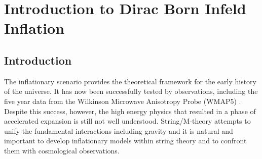 \renewcommand{\CVSrevision}{\version$Id: dbi-intro.tex,v 1.25 2009/08/04 11:22:10 ith Exp $}
\chapter{Introduction to Dirac Born Infeld Inflation}
\label{ch:dbi-intro}

\section{Introduction}
% 
\label{sec:dbi-intro}


The inflationary scenario provides the 
theoretical framework for the early history 
of the universe. It has now been successfully tested by observations, 
including the five year data from the Wilkinson Microwave Anisotropy 
Probe (WMAP5) \cite{Komatsu:2008hk}. Despite this success, however, the high energy 
physics that resulted in a phase of accelerated expansion is still 
not well understood. String/M-theory attempts to unify the fundamental interactions 
including gravity and it is natural and important to 
develop inflationary models within string theory and to confront them with 
cosmological observations. 
 

